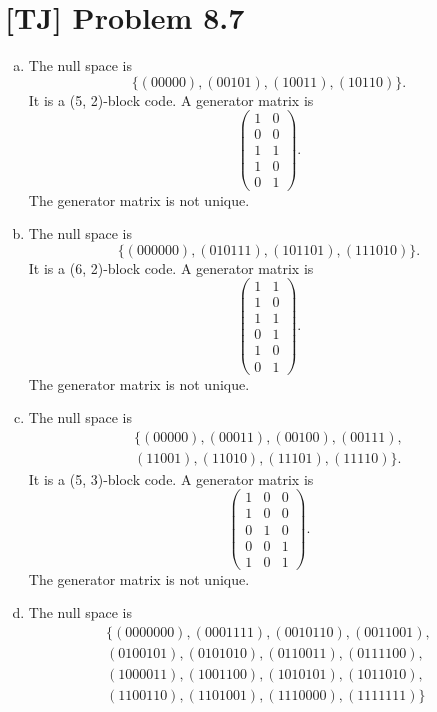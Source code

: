 \documentclass[a4paper,11pt,twocolumn]{article}
\begin{document}
  \section{[TJ] Problem 8.7}
  \begin{enumerate}[(a)]
    \item The null space is
    $$ \{(00000), (00101), (10011), (10110)\}. $$
    It is a (5, 2)-block code. A generator matrix is
    $$ \begin{pmatrix} 1 & 0 \\ 0 & 0 \\ 1 & 1 \\ 1 & 0 \\ 0 & 1 \end{pmatrix} .$$
    The generator matrix is not unique.
    \item The null space is
    $$ \{(000000), (010111), (101101), (111010)\}. $$
    It is a (6, 2)-block code. A generator matrix is
    $$ \begin{pmatrix} 1 & 1 \\ 1 & 0 \\ 1 & 1 \\ 0 & 1 \\ 1 & 0 \\ 0 & 1 \end{pmatrix}. $$
    The generator matrix is not unique.
    \item The null space is
    \begin{multline*}
     \{(00000), (00011), (00100), (00111), \\ (11001), (11010), (11101), (11110)\}.
    \end{multline*}
    It is a (5, 3)-block code. A generator matrix is
    $$ \begin{pmatrix}
      1 & 0 & 0 \\
      1 & 0 & 0 \\
      0 & 1 & 0 \\
      0 & 0 & 1 \\
      1 & 0 & 1
    \end{pmatrix}. $$
    The generator matrix is not unique.
    \item The null space is
    \begin{multline*}
      \{(0000000), (0001111), (0010110), (0011001), \\
        (0100101), (0101010), (0110011), (0111100), \\
        (1000011), (1001100), (1010101), (1011010), \\
        (1100110), (1101001), (1110000), (1111111)\}

\end{multline*}
\end{enumerate}
\end{document}

